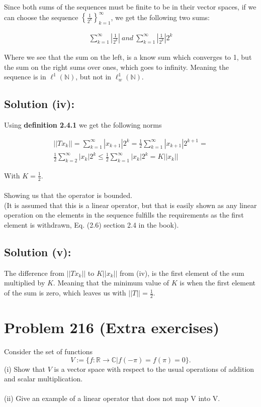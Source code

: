 \documentclass{article}
\begin{document}
Since both sums of the sequences must be finite to be in their vector spaces, if we can choose the sequence $\left \{\frac{1}{2^k}\right \}_{k=1}^\infty$, we get the following two sums:

\begin{gather*}
    \sum_{k=1}^\infty | \frac{1}{2^k}| \: and \: \sum_{k=1}^\infty | \frac{1}{2^k}|2^k
\end{gather*}

Where we see that the sum on the left, is a know sum which converges to 1, but the sum on the right sums over ones, which goes to infinity. Meaning the sequence is in $\ell^1(\mathbb{N})$, but not in $\ell_w^1(\mathbb{N})$.

\subsection*{Solution (iv):}
Using \textbf{definition 2.4.1} we get the following norms

\begin{gather*}
    ||T x_k ||= \sum_{k=1}^\infty |x_{k+1}|2^k = \frac{1}{2}\sum_{k=1}^\infty |x_{k+1}|2^{k+1} =\\
    \frac{1}{2}\sum_{k=2}^\infty |x_{k}|2^k \leq \frac{1}{2}\sum_{k=1}^\infty |x_{k}|2^k = K ||x_k||
\end{gather*}

With $K=\frac{1}{2}$. \\
\\
Showing us that the operator is bounded. \\
(It is assumed that this is a linear operator, but that is easily shown as any linear operation on the elements in the sequence fulfills the requirements as the first element is withdrawn, Eq. (2.6) section 2.4 in the book).

\subsection*{Solution (v):}

The difference from $|| T x_k ||$ to $K ||x_k||$ from (iv), is the first element of the sum multiplied by $K$. Meaning that the minimum value of $K$ is when the first element of the sum is zero, which leaves us with $||T|| = \frac{1}{2}$. 

\section*{Problem 216 (Extra exercises)}
Consider the set of functions
\begin{equation*}
    V := \{f: \mathbb{R} \rightarrow \mathbb{C} | f(-\pi) = f(\pi)=0 \}.
\end{equation*}
(i) Show that $V$ is a vector space with respect to the usual operations of addition and scalar multiplication.\\
\\
(ii) Give an example of a linear operator that does not map V into V. 
\end{document}
